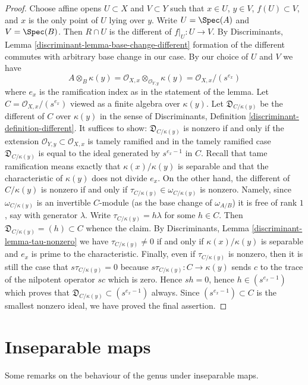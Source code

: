 \begin{proof}
\medskip\noindent
Choose affine opens $U \subset X$ and $V \subset Y$
such that $x \in U$, $y \in V$, $f(U) \subset V$, and $x$ is the only
point of $U$ lying over $y$. Write $U = \Spec(A)$ and $V = \Spec(B)$.
Then $R \cap U$ is the different of $f|_U : U \to V$.
By Discriminants, Lemma \ref{discriminant-lemma-base-change-different}
formation of the different commutes with arbitrary base change
in our case. By our choice of $U$ and $V$ we have
$$
A \otimes_B \kappa(y) =
\mathcal{O}_{X, x} \otimes_{\mathcal{O}_{Y, y}} \kappa(y) =
\mathcal{O}_{X, x}/(s^{e_x})
$$
where $e_x$ is the ramification index as in the statement of the lemma.
Let $C = \mathcal{O}_{X, x}/(s^{e_x})$ viewed as a finite algebra
over $\kappa(y)$. Let $\mathfrak{D}_{C/\kappa(y)}$ be the different
of $C$ over $\kappa(y)$ in the sense of
Discriminants, Definition \ref{discriminant-definition-different}.
It suffices to show: $\mathfrak{D}_{C/\kappa(y)}$
is nonzero if and only if the extension
$\mathcal{O}_{Y, y} \subset \mathcal{O}_{X, x}$ is tamely ramified
and in the tamely ramified case $\mathfrak{D}_{C/\kappa(y)}$
is equal to the ideal generated by $s^{e_x - 1}$ in $C$.
Recall that tame ramification means exactly that $\kappa(x)/\kappa(y)$
is separable and that the characteristic of $\kappa(y)$ does not
divide $e_x$. On the other hand, the different of $C/\kappa(y)$ is nonzero
if and only if $\tau_{C/\kappa(y)} \in \omega_{C/\kappa(y)}$ is nonzero.
Namely, since $\omega_{C/\kappa(y)}$ is an invertible $C$-module
(as the base change of $\omega_{A/B}$)
it is free of rank $1$, say with generator $\lambda$. Write
$\tau_{C/\kappa(y)} = h\lambda$ for some $h \in C$. Then
$\mathfrak{D}_{C/\kappa(y)} = (h) \subset C$ whence the claim.
By Discriminants, Lemma \ref{discriminant-lemma-tau-nonzero}
we have $\tau_{C/\kappa(y)} \not = 0$
if and only if $\kappa(x)/\kappa(y)$
is separable and $e_x$ is prime to the characteristic.
Finally, even if $\tau_{C/\kappa(y)}$ is nonzero, then
it is still the case that $s \tau_{C/\kappa(y)} = 0$
because $s\tau_{C/\kappa(y)} : C \to \kappa(y)$
sends $c$ to the trace of the nilpotent operator $sc$ which is zero.
Hence $sh = 0$, hence $h \in (s^{e_x - 1})$ which proves
that $\mathfrak{D}_{C/\kappa(y)} \subset (s^{e_x - 1})$ always.
Since $(s^{e_x - 1}) \subset C$ is the smallest nonzero ideal,
we have proved the final assertion.
\end{proof}

\section{Inseparable maps}
\label{curves-section-inseparable}
Some remarks on the behaviour of the genus under inseparable maps.

